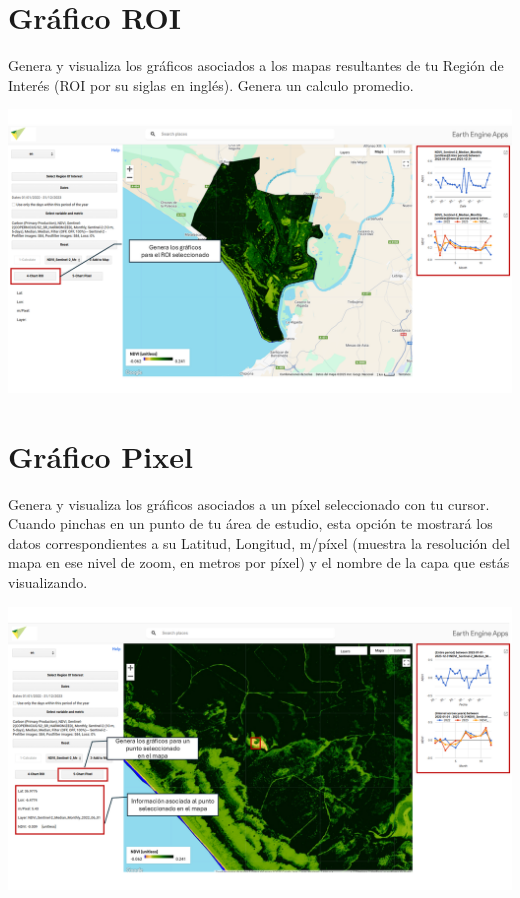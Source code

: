 \documentclass[
]{book}
\begin{document}
\section{\texorpdfstring{\textbf{Gráfico ROI}}{Gráfico ROI}}\label{gruxe1fico-roi}

Genera y visualiza los gráficos asociados a los mapas resultantes de tu Región de Interés (ROI por su siglas en inglés). Genera un calculo promedio.

\includegraphics{assets/graphs_es.png}

\section{\texorpdfstring{\textbf{Gráfico Pixel}}{Gráfico Pixel}}\label{gruxe1fico-pixel}

Genera y visualiza los gráficos asociados a un píxel seleccionado con tu cursor. Cuando pinchas en un punto de tu área de estudio, esta opción te mostrará los datos correspondientes a su Latitud, Longitud, m/píxel (muestra la resolución del mapa en ese nivel de zoom, en metros por píxel) y el nombre de la capa que estás visualizando.

\includegraphics{assets/chart_pixel_es.png}

  
\end{document}
